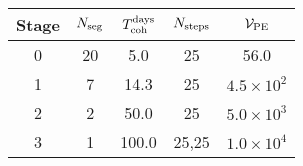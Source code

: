 \begin{tabular}{c|cccc}
Stage & $N_{\rm seg}$ & $T_{\rm coh}^{\rm days}$ &$N_{\rm steps}$ & $\mathcal{V}_{\rm PE}$ \\ \hline
0 & 20 & 5.0 & 25 & 56.0 \\
1 & 7 & 14.3 & 25 & $4.5{\times}10^{2}$ \\
2 & 2 & 50.0 & 25 & $5.0{\times}10^{3}$ \\
3 & 1 & 100.0 & 25,25 & $1.0{\times}10^{4}$ \\
\end{tabular}
